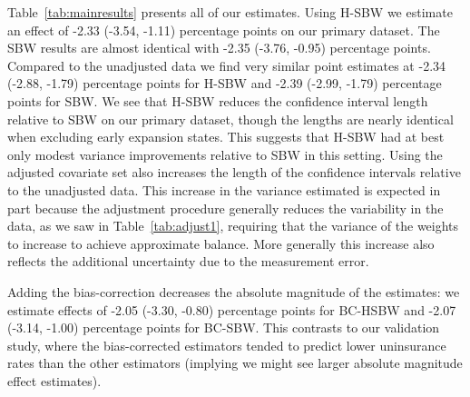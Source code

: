 \documentclass[aoas]{imsart}
\theoremstyle{plain}
\theoremstyle{remark}
\begin{document}
Table~\ref{tab:mainresults} presents all of our estimates. Using H-SBW we estimate an effect of -2.33 (-3.54, -1.11) percentage points on our primary dataset. The SBW results are almost identical with -2.35 (-3.76, -0.95) percentage points. Compared to the unadjusted data we find very similar point estimates at -2.34 (-2.88, -1.79) percentage points for H-SBW and -2.39 (-2.99, -1.79) percentage points for SBW. We see that H-SBW reduces the confidence interval length relative to SBW on our primary dataset, though the lengths are nearly identical when excluding early expansion states. This suggests that H-SBW had at best only modest variance improvements relative to SBW in this setting. Using the adjusted covariate set also increases the length of the confidence intervals relative to the unadjusted data. This increase in the variance estimated is expected in part because the adjustment procedure generally reduces the variability in the data, as we saw in Table~\ref{tab:adjust1}, requiring that the variance of the weights to increase to achieve approximate balance. More generally this increase also reflects the additional uncertainty due to the measurement error.

Adding the bias-correction decreases the absolute magnitude of the estimates: we estimate effects of -2.05 (-3.30, -0.80) percentage points for BC-HSBW and -2.07 (-3.14, -1.00) percentage points for BC-SBW. This contrasts to our validation study, where the bias-corrected estimators tended to predict lower uninsurance rates than the other estimators (implying we might see larger absolute magnitude effect estimates).
\end{document}
